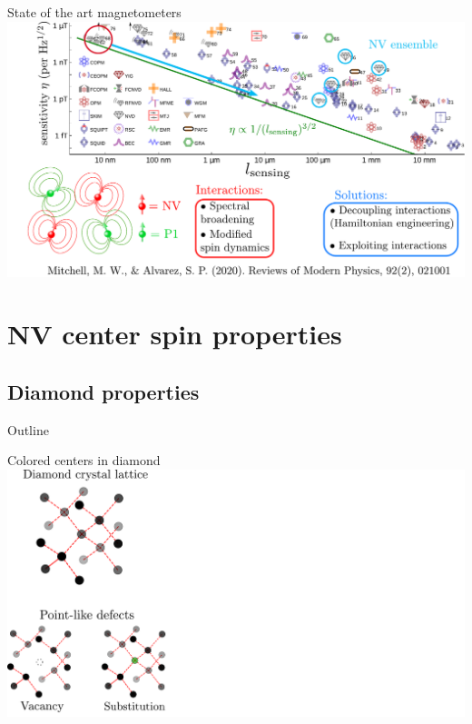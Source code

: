 \documentclass{beamer}
\begin{document}
\begin{frame}{State of the art magnetometers}
\centering
\includegraphics[width=\textwidth,height=0.85\textheight,keepaspectratio]{Slide_quantum_magnetometers_NV_n+2}
\end{frame}




\section{NV center spin properties}
\subsection{Diamond properties}
\begin{frame}{Outline}
\tableofcontents[currentsection]
\end{frame}

\begin{frame}{Colored centers in diamond}
\centering
\includegraphics[width=\textwidth,height=0.85\textheight,keepaspectratio]{Slide diamant_0}
\end{frame}
\end{document}
